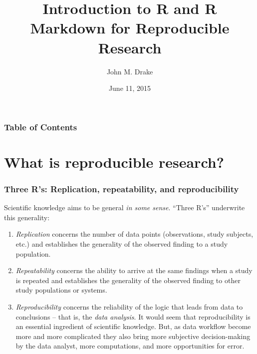 \documentclass[10pt]{beamer}
\title{Introduction to R and R Markdown for Reproducible Research}
\author{John M. Drake}
\institute[UGA]{
  Odum School of Ecology\\
  University of Georgia\\
  Athens, Georgia USA 30602-2202\\[1ex]
  \texttt{jdrake@uga.edu}
}
\date{June 11, 2015}
\theoremstyle{exercise}
\begin{document}


\begin{frame}[fragile]
  \titlepage

\end{frame}

\begin{frame}
  \frametitle{Table of Contents}
  \tableofcontents %

\end{frame}

\section{What is reproducible research?}


\begin{frame}[fragile]
  \frametitle{Three R's: Replication, repeatability, and reproducibility}
  
Scientific knowledge aims to be general \textit{in some sense}. ``Three R's'' underwrite this generality:

\begin{enumerate}
  \item \textit{Replication} concerns the number of data points (observations, study subjects, etc.) and establishes the generality of the observed finding to a study population.
  \item \textit{Repeatability} concerns the ability to arrive at the same findings when a study is repeated and establishes the generality of the observed finding to other study populations or systems.
  \item \textit{Reproducibility} concerns the reliability of the logic that leads from data to conclusions -- that is, the \textit{data analysis}. It would seem that reproducibility is an essential ingredient of scientific knowledge. But, as data workflow become more and more complicated they also bring more subjective decision-making by the data analyst, more computations, and more opportunities for error.
\end{enumerate}
  
\end{frame}
  
\end{document}
